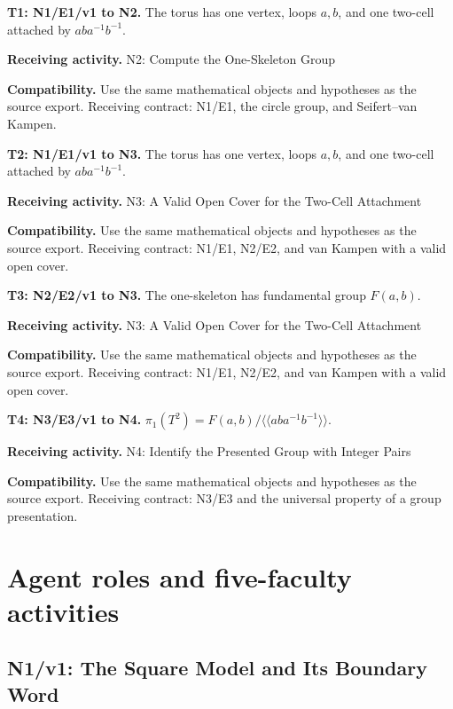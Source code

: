 \documentclass[preprint,12pt,aps,pra,showkeys,amsmath,amssymb,superscriptaddress,floatfix]{revtex4-2}
\theoremstyle{definition}
\theoremstyle{remark}
\newcommand{\field}[2]{\par\smallskip\noindent\textbf{#1.} #2\par}
\begin{document}
\begingroup\small\linespread{1.05}\selectfont

\field{T1: N1/E1/v1 to N2}{The torus has one vertex, loops \(a,b\), and one two-cell attached by
\(aba^{-1}b^{-1}\).}

\field{Receiving activity}{N2: Compute the One-Skeleton Group}

\field{Compatibility}{Use the same mathematical objects and hypotheses as the source export.
Receiving contract: N1/E1, the circle group, and Seifert--van Kampen.}

\field{T2: N1/E1/v1 to N3}{The torus has one vertex, loops \(a,b\), and one two-cell attached by
\(aba^{-1}b^{-1}\).}

\field{Receiving activity}{N3: A Valid Open Cover for the Two-Cell Attachment}

\field{Compatibility}{Use the same mathematical objects and hypotheses as the source export.
Receiving contract: N1/E1, N2/E2, and van Kampen with a valid open
cover.}

\field{T3: N2/E2/v1 to N3}{The one-skeleton has fundamental group \(F(a,b)\).}

\field{Receiving activity}{N3: A Valid Open Cover for the Two-Cell Attachment}

\field{Compatibility}{Use the same mathematical objects and hypotheses as the source export.
Receiving contract: N1/E1, N2/E2, and van Kampen with a valid open
cover.}

\field{T4: N3/E3/v1 to N4}{\(\pi_1(T^2)=F(a,b)/\langle\!\langle aba^{-1}b^{-1}\rangle\!\rangle\).}

\field{Receiving activity}{N4: Identify the Presented Group with Integer Pairs}

\field{Compatibility}{Use the same mathematical objects and hypotheses as the source export.
Receiving contract: N3/E3 and the universal property of a group
presentation.}

\endgroup

\clearpage\section{Agent roles and five-faculty activities}\begingroup\small\linespread{1.05}\selectfont{}

\subsection{N1/v1: The Square Model and Its Boundary Word}
\end{document}
